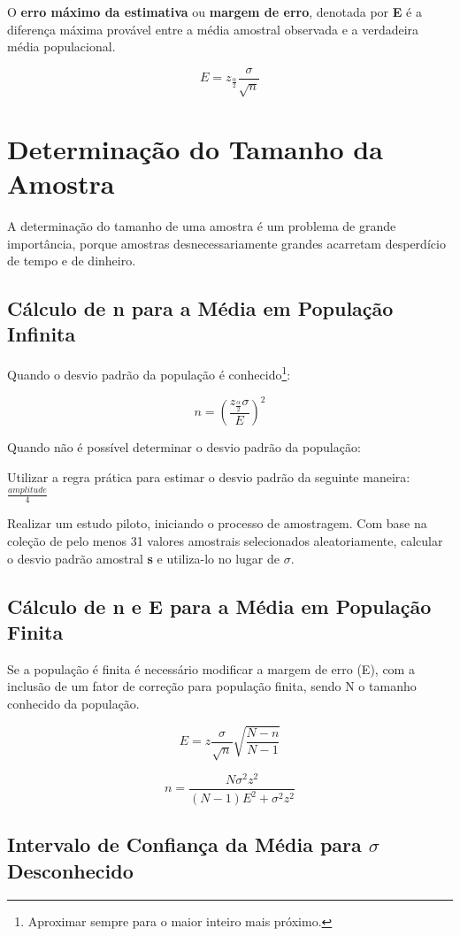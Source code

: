 O \textbf{erro máximo da estimativa} ou \textbf{margem de erro}, denotada por \textbf{E} é a diferença máxima provável entre a média amostral observada e a verdadeira média populacional.

\[E = z_\frac{\alpha}{2}\frac{\sigma}{\sqrt{n}}\]

\section{Determinação do Tamanho da Amostra}

A determinação do tamanho de uma amostra é um problema de grande importância, porque amostras desnecessariamente grandes acarretam desperdício de tempo e de dinheiro.

\subsection{Cálculo de n para a Média em População Infinita}

Quando o desvio padrão da população é conhecido\footnote{Aproximar sempre para o maior inteiro mais próximo.}:

\[n = (\frac{z_\frac{\alpha}{2}\sigma}{E})^2\]

Quando não é possível determinar o desvio padrão da população:
\begin{alineas}
	\item Utilizar a regra prática para estimar o desvio padrão da seguinte maneira: \( \frac{amplitude}{4} \)
	\item Realizar um estudo piloto, iniciando o processo de amostragem. Com base na coleção de pelo menos 31 valores amostrais selecionados aleatoriamente, calcular o desvio padrão amostral \textbf{s} e utiliza-lo no lugar de \(\sigma\).
\end{alineas}

\subsection{Cálculo de n e E para a Média em População Finita}

Se a população é finita é necessário modificar a margem de erro (E), com a inclusão de um fator de correção para população finita, sendo N o tamanho conhecido da população.

\[E = z\frac{\sigma}{\sqrt{n}}\sqrt{\frac{N-n}{N-1}}\]

\[n = \frac{N\sigma^2z^2}{(N-1)E^2+\sigma^2z^2} \]

\subsection{Intervalo de Confiança da Média para \(\sigma\) Desconhecido}


